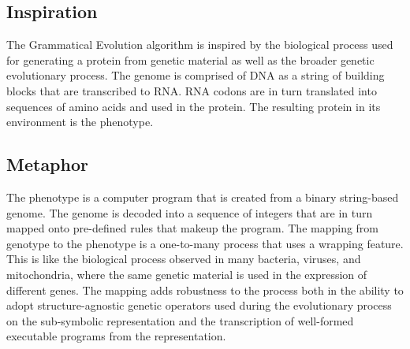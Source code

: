 \subsection{Inspiration}
The Grammatical Evolution algorithm is inspired by the biological process used for generating a protein from genetic material as well as the broader genetic evolutionary process.
The genome is comprised of DNA as a string of building blocks that are transcribed to RNA. RNA codons are in turn translated into sequences of amino acids and used in the protein. The resulting protein in its environment is the phenotype. 

\subsection{Metaphor}
The phenotype is a computer program that is created from a binary string-based genome. The genome is decoded into a sequence of integers that are in turn mapped onto pre-defined rules that makeup the program. 
The mapping from genotype to the phenotype is a one-to-many process that uses a wrapping feature. This is like the biological process observed in many bacteria, viruses, and mitochondria, where the same genetic material is used in the expression of different genes.
The mapping adds robustness to the process both in the ability to adopt structure-agnostic genetic operators used during the evolutionary process on the sub-symbolic representation and the transcription of well-formed executable programs from the representation.


